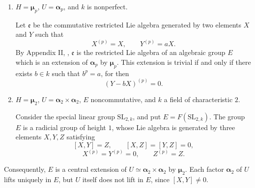 \begin{enumerate}
\item[(c)] 
  \(H=\boldsymbol\mu_p\), \(U=\boldsymbol\alpha_p\), and \(k\)
  is nonperfect.

  Let \(\mathfrak e\) be the commutative restricted Lie algebra
  generated by two elements \(X\) and \(Y\) such that
  \[
    X^{(p)}=X,\qquad Y^{(p)}=aX.
  \]
  By Appendix II, , \(\mathfrak e\) is the restricted Lie
  algebra of an algebraic group \(E\) which is an extension of
  \(\boldsymbol\alpha_p\) by \(\boldsymbol\mu_p\).  This
  extension is trivial if and only if there exists \(b\in k\)
  such that \(b^p=a\), for then
  \[
    (Y-bX)^{(p)}=0.
  \]

\item[(d)] 
  \(H=\boldsymbol\mu_2\), \(U=\boldsymbol\alpha_2\times
  \boldsymbol\alpha_2\), \(E\) noncommutative, and \(k\) a field
  of characteristic \(2\).

  Consider the special linear group \(\mathrm{SL}_{2,k}\), and
  put \(E=F(\mathrm{SL}_{2,k})\).  The group \(E\) is a radicial
  group of height \(1\), whose Lie algebra is generated by three
  elements \(X,Y,Z\) satisfying
  \[
    [X,Y]=Z,\qquad [X,Z]=[Y,Z]=0,
  \]
  \[
    X^{(p)}=Y^{(p)}=0,\qquad Z^{(p)}=Z.
  \]
\end{enumerate}



Consequently, \(E\) is a central extension of
\(U\simeq\boldsymbol\alpha_2\times\boldsymbol\alpha_2\) by
\(\boldsymbol\mu_2\).  Each factor \(\boldsymbol\alpha_2\) of
\(U\) lifts uniquely in \(E\), but \(U\) itself does not lift in
\(E\), since \([X,Y]\ne0\).



